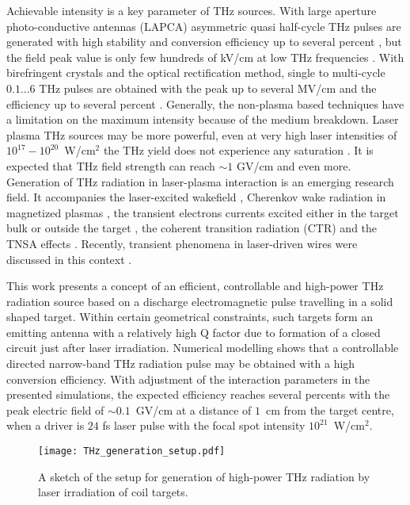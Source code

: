 \documentclass[aps,prl,twocolumn,superscriptaddress]{revtex4-1}
\begin{document}
Achievable intensity is a key parameter of THz sources. With large aperture photo-conductive antennas (LAPCA) asymmetric quasi half-cycle THz pulses are generated with high stability and conversion efficiency up to several percent \cite{Yang2014}, but the field peak value is only few hundreds of kV/cm at low THz frequencies \cite{Ropagnol2016}. With birefringent crystals and the optical rectification method, single to multi-cycle $0.1...6$ THz pulses are obtained with the peak up to several MV/cm \cite{Ovchinnikov2018, Sitnikov2020} and the efficiency up to several percent \cite{Huang2013, Hauri2011}. 
Generally, the non-plasma based techniques have a limitation on the maximum intensity because of the medium breakdown. Laser plasma THz sources may be more powerful, even at very high laser intensities of $10^{17}-10^{20}$~W/cm$^2$ the THz yield does not experience any saturation \cite{Gopal2013}. It is expected that THz field strength can reach $\sim1$ GV/cm \cite{Dechard2018} and even more. 
Generation of THz radiation in laser-plasma interaction is an emerging research field. It accompanies the laser-excited wakefield \cite{Liao2015}, Cherenkov wake radiation in magnetized plasmas \cite{Bakhtiari2017}, the transient electrons currents excited either in the target bulk \cite{Li2016, Liao2016} or outside the target \cite{Herzer2018}, the coherent transition radiation (CTR) and the TNSA effects \cite{Wu2013}. Recently, transient phenomena in laser-driven wires were discussed in this context \cite{Teramoto2018, Zhuo2017, Nakajima2017,  Tian2017, Zeng2020}.  

This work presents a concept of an efficient, controllable and high-power THz radiation source based on a discharge electromagnetic pulse travelling in a solid shaped target. Within certain geometrical constraints, such targets form an emitting antenna with a relatively high Q factor due to formation of a closed circuit just after laser irradiation. Numerical modelling shows that a controllable directed narrow-band THz radiation pulse may be obtained with a high conversion efficiency. With adjustment of the interaction parameters in the presented simulations, the expected efficiency reaches several percents with the peak electric field of {$\sim 0.1$~GV/cm} at a distance of $1$~cm from the target centre, when a driver is $24$ fs laser pulse with the focal spot intensity $10^{21}$~W/cm$^2$.
\begin{figure}
    \centering
    \texttt{[image: THz\_generation\_setup.pdf]}
    \caption{A sketch of the setup for generation of high-power THz radiation by laser irradiation of coil targets.}
    \label{THz_generation_setup}
\end{figure}
\end{document}
